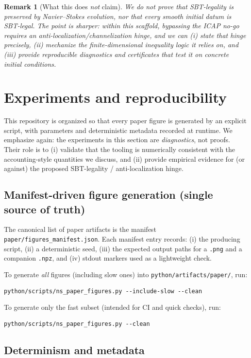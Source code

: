 \documentclass[11pt]{article}
\newtheorem{remark}{Remark}
\begin{document}
\begin{remark}[What this does \emph{not} claim]
We do not prove that SBT-legality is preserved by Navier--Stokes evolution, nor that every smooth
initial datum is SBT-legal. The point is sharper: within this scaffold, \emph{bypassing the ICAP no-go}
requires an anti-localization/channelization hinge, and we can (i) state that hinge precisely,
(ii) mechanize the finite-dimensional inequality logic it relies on, and (iii) provide reproducible
diagnostics and certificates that test it on concrete initial conditions.
\end{remark}
 \section{Experiments and reproducibility}
\label{sec:experiments}

This repository is organized so that every paper figure is generated by an explicit script,
with parameters and deterministic metadata recorded at runtime.
We emphasize again: the experiments in this section are \emph{diagnostics}, not proofs.
Their role is to (i) validate that the tooling is numerically consistent with the accounting-style
quantities we discuss, and (ii) provide empirical evidence for (or against) the proposed
SBT-legality / anti-localization hinge.

\subsection{Manifest-driven figure generation (single source of truth)}

The canonical list of paper artifacts is the manifest
\nolinkurl{paper/figures_manifest.json}.
Each manifest entry records:
(i) the producing script, (ii) a deterministic seed, (iii) the expected output paths for a
\texttt{.png} and a companion \texttt{.npz}, and (iv) stdout markers used as a lightweight check.

To generate \emph{all} figures (including slow ones) into \texttt{python/artifacts/paper/}, run:
\begin{verbatim}
python/scripts/ns_paper_figures.py --include-slow --clean
\end{verbatim}
To generate only the fast subset (intended for CI and quick checks), run:
\begin{verbatim}
python/scripts/ns_paper_figures.py --clean
\end{verbatim}

\subsection{Determinism and metadata}
\end{document}
